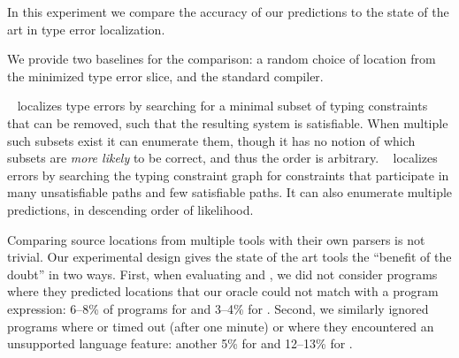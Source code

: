 \label{sec:nate:quantitative}

In this experiment we compare the accuracy of our predictions to the
state of the art in type error localization.

We provide two baselines for the comparison: a random choice of location
from the minimized type error slice, and the standard \ocaml compiler.

\mycroft~\citep{Loncaric2016-uk} localizes type errors by searching for
a minimal subset of typing constraints that can be removed, such that
the resulting system is satisfiable.
%
When multiple such subsets exist it can enumerate them, though it has no
notion of which subsets are \emph{more likely} to be correct, and thus
the order is arbitrary.
%
\sherrloc~\citep{Zhang2014-lv} localizes errors by searching the typing
constraint graph for constraints that participate in many unsatisfiable
paths and few satisfiable paths.
%
It can also enumerate multiple predictions, in descending order of
likelihood.

Comparing source locations from multiple tools with their own parsers is
not trivial.
%
Our experimental design gives the state of the art tools the ``benefit
of the doubt'' in two ways.
First, when evaluating \mycroft and \sherrloc, we did not consider
programs where they predicted locations that our oracle could not match
with a program expression: 6--8\% of programs for \mycroft and 3--4\%
for \sherrloc.
%
Second, we similarly ignored programs where \mycroft or \sherrloc timed
out (after one minute) or where they encountered an unsupported language
feature: another 5\% for \mycroft and 12--13\% for \sherrloc.
%


